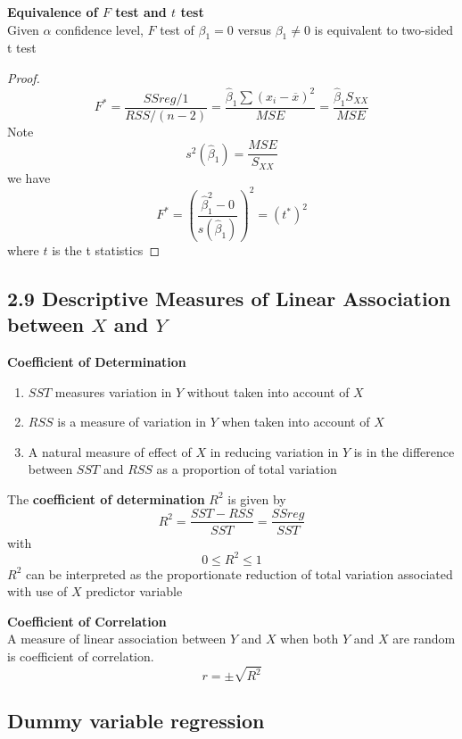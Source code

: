 \documentclass[11pt]{article}
\begin{document}
\begin{defn*}
	\textbf{Equivalence of $F$ test and $t$ test}\\
	Given $\alpha$ confidence level, $F$ test of $\beta_1 = 0$ versus $\beta_1 \neq 0$ is equivalent to two-sided t test 
	\begin{proof}
		\[
			F^* 
			= \frac{SSreg/1}{RSS/(n-2)}
			= \frac{\hat{\beta}_1 \sum (x_i - \overline{x})^2}{MSE}
			= \frac{\hat{\beta}_1 S_{XX}}{MSE}
		\]
		Note 
		\[
			s^2(\hat{\beta}_1) = \frac{MSE}{S_{XX}}
		\]
		we have 
		\[
			F^* = \left( \frac{\hat{\beta}_1^2 - 0}{s(\hat{\beta}_1)} \right)^2
			= (t^*)^2
		\]
		where $t$ is the t statistics
	\end{proof}
\end{defn*}


\subsection*{2.9 Descriptive Measures of \textbf{Linear Association} between $X$ and $Y$}

\begin{defn*}
	\textbf{Coefficient of Determination} \\
	\begin{enumerate}
		\item $SST$ measures variation in $Y$ without taken into account of $X$
		\item $RSS$ is a measure of variation in $Y$ when taken into account of $X$
		\item A natural measure of effect of $X$ in reducing variation in $Y$ is in the difference between $SST$ and $RSS$ as a proportion of total variation 
	\end{enumerate}
	The \textbf{coefficient of determination} $R^2$ is given by
	\[
		R^2= \frac{SST - RSS}{SST}= \frac{SSreg}{SST}
	\]
	with 
	\[
		0 \leq R^2 \leq 1
	\]
	$R^2$ can be interpreted as the proportionate reduction of total variation associated with use of $X$ predictor variable
\end{defn*}



\begin{defn*}
	\textbf{Coefficient of Correlation}\\ 
	A measure of linear association between $Y$ and $X$ when both $Y$ and $X$ are random is coefficient of correlation. 
	\[
		r = \pm \sqrt{R^2}
	\]
\end{defn*}


\subsection*{Dummy variable regression}
\end{document}
